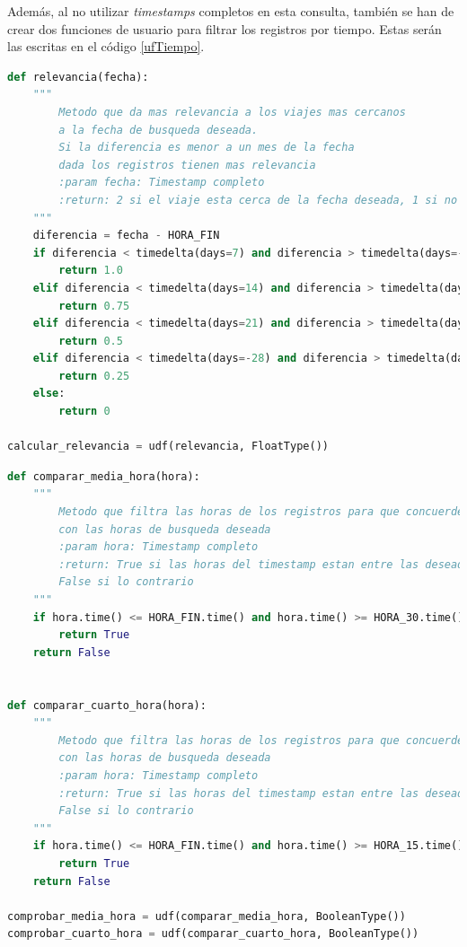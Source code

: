 Además, al no utilizar \textit{timestamps} completos en esta consulta, también se han de crear dos funciones de usuario para filtrar los registros por tiempo. Estas serán las escritas en el código \ref{ufTiempo}.

\clearpage
\begin{lstlisting}[label=infProf,language=Python,frame=single,caption=Función de usuario para aplicar el factor de relevancia]
def relevancia(fecha):
    """
        Metodo que da mas relevancia a los viajes mas cercanos
        a la fecha de busqueda deseada.
        Si la diferencia es menor a un mes de la fecha
        dada los registros tienen mas relevancia
        :param fecha: Timestamp completo
        :return: 2 si el viaje esta cerca de la fecha deseada, 1 si no
    """
    diferencia = fecha - HORA_FIN
    if diferencia < timedelta(days=7) and diferencia > timedelta(days=-7):
        return 1.0
    elif diferencia < timedelta(days=14) and diferencia > timedelta(days=-14):
        return 0.75
    elif diferencia < timedelta(days=21) and diferencia > timedelta(days=-21):
        return 0.5
    elif diferencia < timedelta(days=-28) and diferencia > timedelta(days=-28):
        return 0.25
    else:
        return 0

calcular_relevancia = udf(relevancia, FloatType())
\end{lstlisting}

\begin{lstlisting}[label=ufTiempo,language=Python,frame=single,caption=Funciones de usuario para filtrar los registros por tiempo]
def comparar_media_hora(hora):
    """
        Metodo que filtra las horas de los registros para que concuerden
        con las horas de busqueda deseada
        :param hora: Timestamp completo
        :return: True si las horas del timestamp estan entre las deseadas
        False si lo contrario
    """
    if hora.time() <= HORA_FIN.time() and hora.time() >= HORA_30.time():
        return True
    return False


def comparar_cuarto_hora(hora):
    """
        Metodo que filtra las horas de los registros para que concuerden
        con las horas de busqueda deseada
        :param hora: Timestamp completo
        :return: True si las horas del timestamp estan entre las deseadas
        False si lo contrario
    """
    if hora.time() <= HORA_FIN.time() and hora.time() >= HORA_15.time():
        return True
    return False

comprobar_media_hora = udf(comparar_media_hora, BooleanType())
comprobar_cuarto_hora = udf(comparar_cuarto_hora, BooleanType())
\end{lstlisting}

